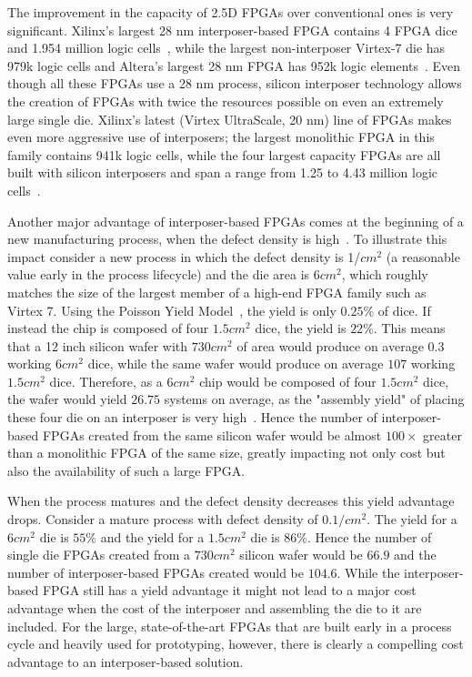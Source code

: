 \documentclass[journal]{IEEEtran}
\begin{document}
The improvement in the capacity of 2.5D FPGAs over conventional ones is very significant. Xilinx's largest 28 nm interposer-based FPGA contains 4 FPGA dice and 1.954 million logic cells~\cite{xilinx7series}, while the largest non-interposer Virtex-7 die has 979k logic cells and Altera's largest 28 nm FPGA has 952k logic elements~\cite{stratixV}. Even though all these FPGAs use a 28 nm process, silicon interposer technology allows the creation of FPGAs with twice the resources possible on even an extremely large single die. Xilinx's latest (Virtex UltraScale, 20 nm) line of FPGAs makes even more aggressive use of interposers; the largest monolithic FPGA in this family contains 941k logic cells, while the four largest capacity FPGAs are all built with silicon interposers and span a range from 1.25 to 4.43 million logic cells~\cite{virtexultrascale}.

Another major advantage of interposer-based FPGAs comes at the beginning of a new manufacturing process, when the defect density is high~\cite{xilinxTSVperformance}. To illustrate this impact consider a new process in which the defect density is 1/$cm^2$ (a reasonable value early in the process lifecycle) and the die area is $6cm^2$, which roughly matches the size of the largest member of a high-end FPGA family such as Virtex 7. Using the Poisson Yield Model~\cite{yieldmodel}, the yield is only $0.25\%$ of dice. If instead the chip is composed of four $1.5cm^2$ dice, the yield is $22\%$. This means that a 12 inch silicon wafer with $730cm^2$ of area would produce on average $0.3$ working $6cm^2$ dice, while the same wafer would produce on average $107$ working $1.5cm^2$ dice. Therefore, as a $6cm^2$ chip would be composed of four $1.5cm^2$ dice, the wafer would yield $26.75$ systems on average, as the "assembly yield" of placing these four die on an interposer is very high~\cite{xilinxTSV}. Hence the number of interposer-based FPGAs created from the same silicon wafer would be almost $100\times$ greater than a monolithic FPGA of the same size, greatly impacting not only cost but also the availability of such a large FPGA.

When the process matures and the defect density decreases this yield advantage drops. Consider a mature process with defect density of $0.1/cm^2$. The yield for a $6cm^2$ die is $55\%$ and the yield for a $1.5cm^2$ die is $86\%$. Hence the number of single die FPGAs created from a $730cm^2$ silicon wafer would be $66.9$ and the number of interposer-based FPGAs created would be $104.6$. While the interposer-based FPGA still has a yield advantage it might not lead to a major cost advantage when the cost of the interposer and assembling the die to it are included. For the large, state-of-the-art FPGAs that are built early in a process cycle and heavily used for prototyping, however, there is clearly a compelling cost advantage to an interposer-based solution.
\end{document}
